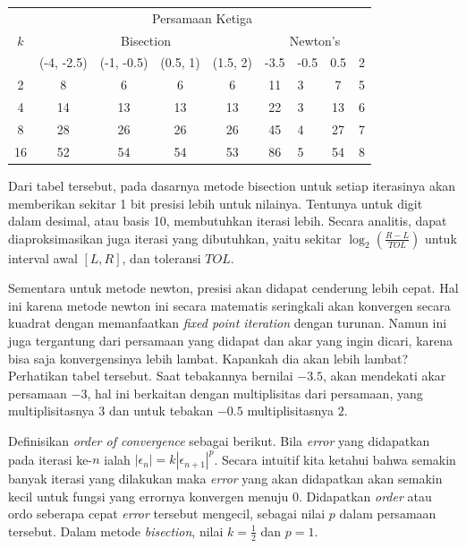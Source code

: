 \documentclass[11pt, a4paper, onecolumn, oneside, final]{report}
\begin{document}
\begin{table}[H]
\centering
\begin{tabular}{|c|c|c|c|c|c|l|c|c|}
\hline
\multirow{3}{*}{$k$} & \multicolumn{8}{c|}{Persamaan Ketiga} \\ \cline{2-9} 
 & \multicolumn{4}{c|}{Bisection} & \multicolumn{4}{c|}{Newton's} \\ \cline{2-9} 
 & (-4, -2.5) & (-1, -0.5) & (0.5, 1) & (1.5, 2) & -3.5 & -0.5 & 0.5 & 2 \\ \hline
2 & 8 & 6 & 6 & 6 & 11 & 3 & 7 & 5 \\ \hline
4 & 14 & 13 & 13 & 13 & 22 & 3 & 13 & 6 \\ \hline
8 & 28 & 26 & 26 & 26 & 45 & 4 & 27 & 7 \\ \hline
16 & 52 & 54 & 54 & 53 & 86 & 5 & 54 & 8 \\ \hline
\end{tabular}
\end{table}

Dari tabel tersebut, pada dasarnya metode bisection untuk setiap iterasinya akan memberikan sekitar 1 bit presisi lebih untuk nilainya. Tentunya untuk digit dalam desimal, atau basis 10, membutuhkan iterasi lebih. Secara analitis, dapat diaproksimasikan juga iterasi yang dibutuhkan, yaitu sekitar $\log_2(\frac{R - L}{TOL})$ untuk interval awal $[L, R]$, dan toleransi $TOL$.

Sementara untuk metode newton, presisi akan didapat cenderung lebih cepat. Hal ini karena metode newton ini secara matematis seringkali akan konvergen secara kuadrat dengan memanfaatkan \textit{fixed point iteration} dengan turunan. Namun ini juga tergantung dari persamaan yang didapat dan akar yang ingin dicari, karena bisa saja konvergensinya lebih lambat. Kapankah dia akan lebih lambat? Perhatikan tabel tersebut. Saat tebakannya bernilai $-3.5$, akan mendekati akar persamaan $-3$, hal ini berkaitan dengan multiplisitas dari persamaan, yang multiplisitasnya $3$ dan untuk tebakan $-0.5$ multiplisitasnya $2$.

Definisikan \textit{order of convergence} sebagai berikut. Bila \textit{error} yang didapatkan pada iterasi ke-$n$ ialah $|\epsilon_n| = k |\epsilon_{n+1}|^p$. Secara intuitif kita ketahui bahwa semakin banyak iterasi yang dilakukan maka \textit{error} yang akan didapatkan akan semakin kecil untuk fungsi yang errornya konvergen menuju $0$. Didapatkan \textit{order} atau ordo seberapa cepat \textit{error} tersebut mengecil, sebagai nilai $p$ dalam persamaan tersebut. Dalam metode \textit{bisection}, nilai $k = \frac{1}{2}$ dan $p = 1$.
\end{document}
